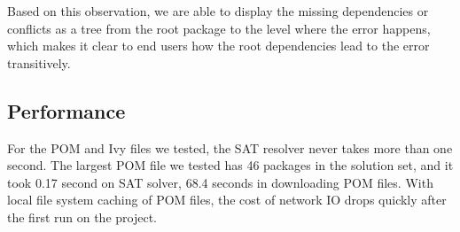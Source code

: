 Based on this observation, we are able to display the missing dependencies or conflicts as a tree from the root package to the level where the error happens, which makes it clear to end users how the root dependencies lead to the error transitively.

\subsection{Performance}

For the POM and Ivy files we tested, the SAT resolver never takes more than one second. The largest POM file we tested has 46 packages in the solution set, and it took 0.17 second on SAT solver, 68.4 seconds in downloading POM files. With local file system caching of POM files, the cost of network IO drops quickly after the first run on the project.


